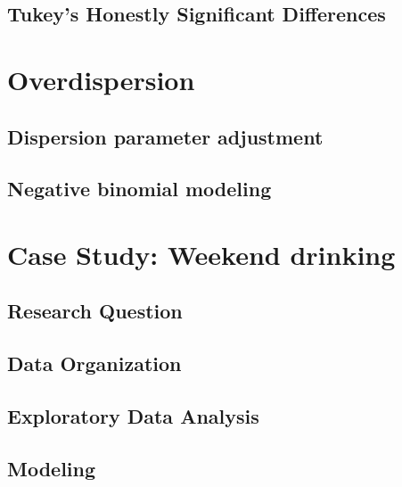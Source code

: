 \documentclass[
]{krantz}
\begin{document}
\hypertarget{tukeys-honestly-significant-differences}{%
\subsection{Tukey's Honestly Significant Differences}\label{tukeys-honestly-significant-differences}}

\hypertarget{sec-overdispPois}{%
\section{Overdispersion}\label{sec-overdispPois}}

\hypertarget{dispersion-parameter-adjustment}{%
\subsection{Dispersion parameter adjustment}\label{dispersion-parameter-adjustment}}

\hypertarget{negative-binomial-modeling}{%
\subsection{Negative binomial modeling}\label{negative-binomial-modeling}}

\hypertarget{cs:drinking}{%
\section{Case Study: Weekend drinking}\label{cs:drinking}}

\hypertarget{research-question}{%
\subsection{Research Question}\label{research-question}}

\hypertarget{data-organization-2}{%
\subsection{Data Organization}\label{data-organization-2}}

\hypertarget{exploratory-data-analysis-1}{%
\subsection{Exploratory Data Analysis}\label{exploratory-data-analysis-1}}

\hypertarget{modeling}{%
\subsection{Modeling}\label{modeling}}
\end{document}
